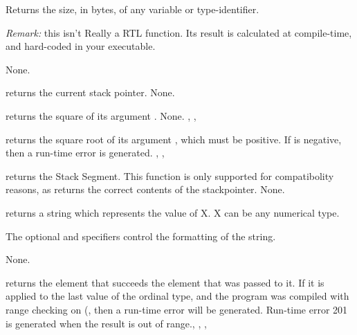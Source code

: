 \documentclass{report}
\begin{document}
{ Returns the size, in bytes, of any variable or type-identifier.

 {\em Remark:} this isn't Really a RTL function. Its result is calculated at
compile-time, and hard-coded in your executable.}
{None.}
{}

\html{}

{ returns the current stack pointer.
}{None.}{}

\html{}

{ returns the square of its argument .}
{None.}
{, , }

\html{}

{ returns the square root of its argument , which must be
positive.}
{If  is negative, then a run-time error is generated.}
{, , }

\html{}

{  returns the Stack Segment. This function is only 
 supported for compatibolity reasons, as  returns the
correct contents of the stackpointer.}
{None.}{}

\html{}


{ returns a string which represents the value of X. X can be any
numerical type.

The optional  and  specifiers control the
formatting of the string.}
{None.}
{}

\html{}

{  returns the element that succeeds the element that was passed
to it. If it is applied to the last value of the ordinal type, and the
program was compiled with range checking on (, then a run-time
error will be generated.
}{Run-time error 201 is generated when the result is out of
range.}{, , , }
\end{document}
